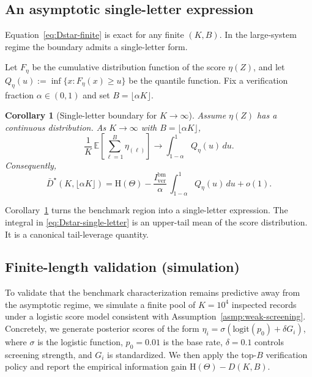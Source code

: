 \documentclass[twocolumn]{scholar7}
\newtheorem{corollary}[theorem]{Corollary}
\newcommand{\E}{\mathbb{E}}
\newcommand{\Hh}{\mathrm{H}}
\newcommand{\bracks}[1]{\left[#1\right]}
\begin{document}
\begin{appendix}
\subsection{An asymptotic single-letter expression}
Equation~\eqref{eq:Dstar-finite} is exact for any finite $(K,B)$.
In the large-system regime the boundary admits a single-letter form.

Let $F_\eta$ be the cumulative distribution function of the score $\eta(Z)$, and let $Q_\eta(u):=\inf\{x: F_\eta(x)\ge u\}$ be the quantile function.
Fix a verification fraction $\alpha\in(0,1)$ and set $B=\lfloor \alpha K\rfloor$.

\begin{corollary}[Single-letter boundary for $K\to\infty$]
\label{cor:single-letter}
Assume $\eta(Z)$ has a continuous distribution.
As $K\to\infty$ with $B=\lfloor \alpha K\rfloor$,
\begin{equation}
  \frac{1}{K}\,\E\bracks{\sum_{\ell=1}^{B} \eta_{(\ell)}}
  \to
  \int_{1-\alpha}^{1} Q_\eta(u)\,du.
  \label{eq:topB-quantile}
\end{equation}
Consequently,
\begin{equation}
  \bar{D}^{\star}(K,\lfloor \alpha K\rfloor)
  =
  \Hh(\Theta)
  -
  \frac{I_{\mathrm{ver}}^{\mathrm{bm}}}{\alpha}\,\int_{1-\alpha}^{1} Q_\eta(u)\,du
  + o(1).
  \label{eq:Dstar-single-letter}
\end{equation}
\end{corollary}

Corollary~\ref{cor:single-letter} turns the benchmark region into a single-letter expression.
The integral in \eqref{eq:Dstar-single-letter} is an upper-tail mean of the score distribution.
It is a canonical tail-leverage quantity.

\subsection{Finite-length validation (simulation)}
\label{subsec:finite-length-validation}

To validate that the benchmark characterization remains predictive away from the asymptotic regime, we simulate a finite pool of $K=10^4$ inspected records under a logistic score model consistent with Assumption~\ref{asmp:weak-screening}. Concretely, we generate posterior scores of the form $\eta_i=\sigma(\mathrm{logit}(p_0)+\delta G_i)$, where $\sigma$ is the logistic function, $p_0=0.01$ is the base rate, $\delta=0.1$ controls screening strength, and $G_i$ is standardized. We then apply the top-$B$ verification policy and report the empirical information gain $\Hh(\Theta)-D(K,B)$.


\end{appendix}
\end{document}
